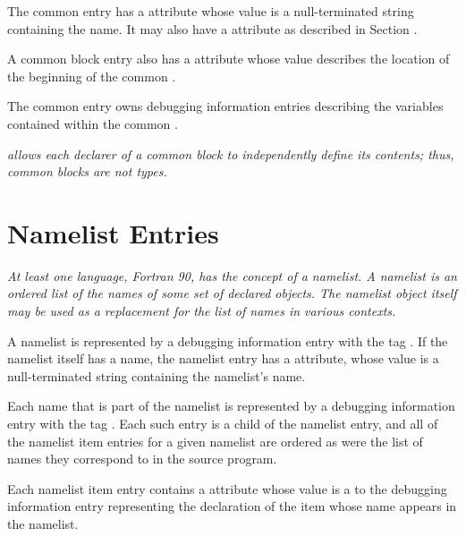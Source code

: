 The common  
entry has a \DWATname{} attribute
whose value is a null-terminated string containing the
name. It may also have a \DWATlinkagename{} attribute as described 
in Section . 

A common block entry also has a \DWATlocation{} attribute
whose value describes the
location of the beginning of the common . 

The common
 entry owns debugging information entries describing
the variables contained within the common .

\textit{ allows each declarer of a common block 
to independently define its contents; thus, common blocks are not types.}

\section{Namelist Entries}
\label{chap:namelistentries}
\textit{At least one language, Fortran 90, has the concept of a
namelist. A namelist is an ordered list of the names of some
set of declared objects. The namelist object itself may be used
as a replacement for the list of names in various contexts.}

A namelist is represented by a debugging information entry
with the tag \DWTAGnamelistTARG.
If the namelist itself has a
name, the namelist entry has a \DWATname{} attribute,
whose value is a null-terminated
string containing the namelist\textquoteright{}s
name.

Each\hypertarget{chap:DWATnamelistitemnamelistitem}{}
name that is part of the namelist is represented
by a debugging information entry with the tag
\DWTAGnamelistitemTARG. 
Each such entry is a child of the
namelist entry, and all of the 
namelist item entries for a
given namelist are ordered as were the list of names they
correspond to in the source program.

Each namelist item entry contains a 
\DWATnamelistitemDEFN{} attribute
whose 
value is a  to the debugging
information entry representing the declaration of the item
whose name appears in the namelist.


